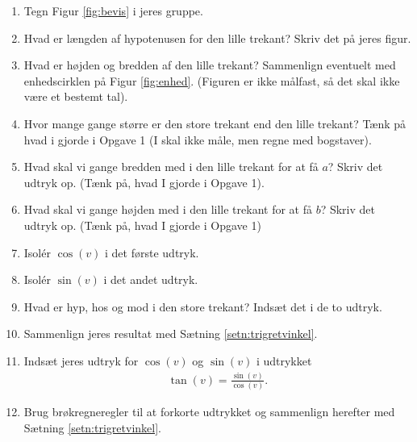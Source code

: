 \begin{enumerate}[label=\roman*)]
	\item Tegn Figur \ref{fig:bevis} i jeres gruppe. 
	\item Hvad er længden af hypotenusen for den lille trekant? Skriv det på jeres figur.
	\item Hvad er højden og bredden af den lille trekant? Sammenlign eventuelt med enhedscirklen på Figur \ref{fig:enhed}. (Figuren er ikke målfast, så det skal ikke være et bestemt tal).
	\item Hvor mange gange større er den store trekant end den lille trekant? Tænk på hvad i gjorde i Opgave 1 (I skal ikke måle, men regne med bogstaver).
	\item Hvad skal vi gange bredden med i den lille trekant for at få $a$? Skriv det udtryk op. (Tænk på, hvad I gjorde i Opgave 1).
	\item Hvad skal vi gange højden med i den lille trekant for at få $b$? Skriv det udtryk op.
	(Tænk på, hvad I gjorde i Opgave 1)
	\item Isolér $\cos(v)$ i det første udtryk. 
	\item Isolér $\sin(v)$ i det andet udtryk. 
	\item Hvad er hyp, hos og mod i den store trekant? Indsæt det i de to udtryk. 
	\item Sammenlign jeres resultat med Sætning \ref{setn:trigretvinkel}.
	\item Indsæt jeres udtryk for $\cos(v)$ og $\sin(v)$ i udtrykket
	\begin{align*}
		\tan(v) = \frac{\sin(v)}{\cos(v)}.	
	\end{align*}	 
	\item Brug brøkregneregler til at forkorte udtrykket og sammenlign herefter med Sætning \ref{setn:trigretvinkel}.
\end{enumerate}


